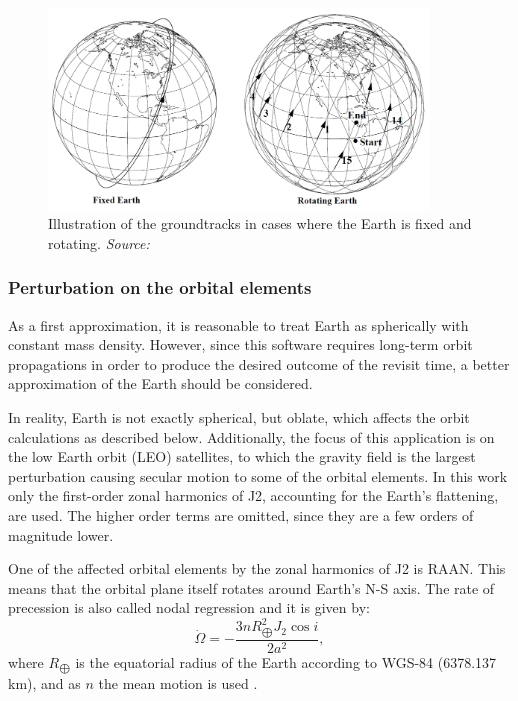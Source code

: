 \begin{figure}
\centering
\includegraphics[width=0.9\textwidth]{Images/groundtrack-fixed-rotating.png}\caption{Illustration of the groundtracks in cases where the Earth is fixed and rotating. \textit{Source: \cite{Vallado}}}
\label{groundtrack-fixed-rotating} 
\end{figure}


\bigskip
\subsubsection{Perturbation on the orbital elements}
\bigskip

As a first approximation, it is reasonable to treat Earth as spherically with constant mass density. However, since this software requires long-term orbit propagations in order to produce the desired outcome of the revisit time, a better approximation of the Earth should be considered.

In reality, Earth is not exactly spherical, but oblate, which affects the orbit calculations as described below. 
Additionally, the focus of this application is on the low Earth orbit (LEO) satellites, to which the gravity field is the largest perturbation causing secular motion to some of the orbital elements. In this work only the first-order zonal harmonics of J2, accounting for the Earth's flattening, are used. The higher order terms are omitted, since they are a few orders of magnitude lower.

One of the affected orbital elements by the zonal harmonics of J2 is RAAN. This means that the orbital plane itself rotates around Earth's N-S axis. The rate of precession is also called nodal regression and it is given by:
\begin{equation}
\dot{\Omega} = - \frac{3 n R_{\bigoplus}^{2} J_{2} \cos{i}}{2 a^{2}},
\end{equation}
where $R_{\bigoplus}$ is the equatorial radius of the Earth according to WGS-84 (6378.137 km), and as $n$ the mean motion is used \cite{Montenbruck}.

